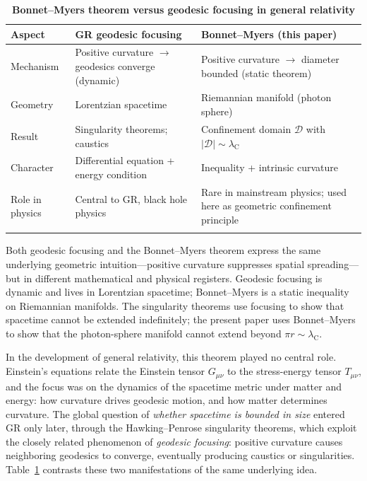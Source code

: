 \documentclass[%
 reprint, amsmath,amssymb, aps, prb, ]{revtex4-2}
\numberwithin{equation}{section}
\newcommand{\lambdaC}{\lambda_{\mathrm{C}}}
\begin{document}
\begin{table}[t!]
\centering
\caption{\textbf{Bonnet--Myers theorem versus geodesic focusing in general relativity}}
\label{tab:bonnet_vs_focusing}
\renewcommand{\arraystretch}{1.4}
\begin{tabular}{p{4.0cm}p{5.5cm}p{5.5cm}}
\toprule
\textbf{Aspect} & \textbf{GR geodesic focusing} & \textbf{Bonnet--Myers (this paper)} \\
\midrule
Mechanism
& Positive curvature $\to$ geodesics converge (dynamic)
& Positive curvature $\to$ diameter bounded (static theorem) \\
\addlinespace[0.3cm]
Geometry
& Lorentzian spacetime
& Riemannian manifold (photon sphere) \\
\addlinespace[0.3cm]
Result
& Singularity theorems; caustics
& Confinement domain $\mathcal{D}$ with $|\mathcal{D}| \sim \lambdaC$ \\
\addlinespace[0.3cm]
Character
& Differential equation + energy condition
& Inequality + intrinsic curvature \\
\addlinespace[0.3cm]
Role in physics
& Central to GR, black hole physics
& Rare in mainstream physics; used here as geometric confinement principle \\
\addlinespace[0.2cm]
\bottomrule
\end{tabular}
\vspace{0.2cm}
\begin{minipage}{0.95\textwidth}
\justifying\footnotesize
Both geodesic focusing and the Bonnet--Myers theorem express the same underlying geometric intuition---positive curvature suppresses spatial spreading---but in different mathematical and physical registers. Geodesic focusing is dynamic and lives in Lorentzian spacetime; Bonnet--Myers is a static inequality on Riemannian manifolds. The singularity theorems use focusing to show that spacetime cannot be extended indefinitely; the present paper uses Bonnet--Myers to show that the photon-sphere manifold cannot extend beyond $\pi r \sim \lambdaC$.
\end{minipage}
\end{table}

In the development of general relativity, this theorem played no central role. Einstein's equations relate the Einstein tensor $G_{\mu\nu}$ to the stress-energy tensor $T_{\mu\nu}$, and the focus was on the dynamics of the spacetime metric under matter and energy: how curvature drives geodesic motion, and how matter determines curvature. The global question of \emph{whether spacetime is bounded in size} entered GR only later, through the Hawking--Penrose singularity theorems, which exploit the closely related phenomenon of \emph{geodesic focusing}: positive curvature causes neighboring geodesics to converge, eventually producing caustics or singularities. Table~\ref{tab:bonnet_vs_focusing} contrasts these two manifestations of the same underlying idea.
\end{document}

